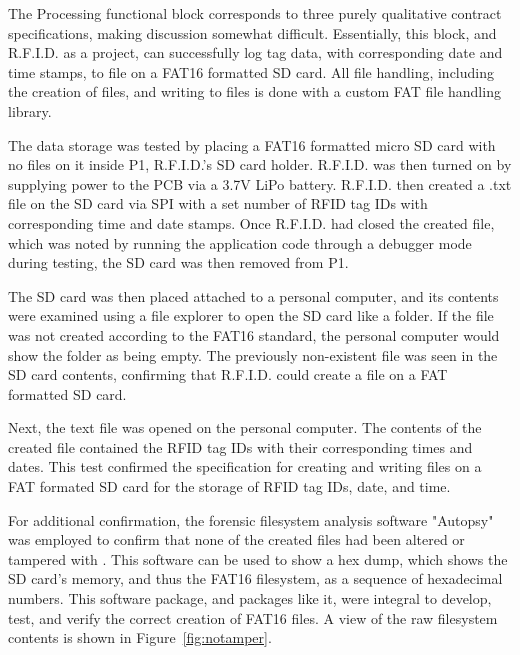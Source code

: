The Processing functional block corresponds to three purely qualitative contract specifications, making discussion somewhat difficult. Essentially, this block, and R.F.I.D. as a project, can successfully log tag data, with corresponding date and time stamps, to file on a FAT16 formatted SD card. All file handling, including the creation of files, and writing to files is done with a custom FAT file handling library.

The data storage was tested by placing a FAT16 formatted micro SD card with no files on it inside P1, R.F.I.D.'s SD card holder. R.F.I.D. was then turned on by supplying power to the PCB via a 3.7V LiPo battery. R.F.I.D. then created a .txt file on the SD card via SPI with a set number of RFID tag IDs with corresponding time and date stamps. Once R.F.I.D. had closed the created file, which was noted by running the application code through a debugger mode during testing, the SD card was then removed from P1.

The SD card was then placed attached to a personal computer, and its contents were examined using a file explorer to open the SD card like a folder. If the file was not created according to the FAT16 standard, the personal computer would show the folder as being empty. The previously non-existent file was seen in the SD card contents, confirming that R.F.I.D. could create a file on a FAT formatted SD card. 

Next, the text file was opened on the personal computer. The contents of the created file contained the RFID tag IDs with their corresponding times and dates. This test confirmed the specification for creating and writing files on a FAT formated SD card for the storage of RFID tag IDs, date, and time. 

For additional confirmation, the forensic filesystem analysis software "Autopsy" was employed to confirm that none of the created files had been altered or tampered with \cite{src_autopsy}. This software can be used to show a hex dump, which shows the SD card's memory, and thus the FAT16 filesystem, as a sequence of hexadecimal numbers. This software package, and packages like it, were integral to develop, test, and verify the correct creation of FAT16 files. A view of the raw filesystem contents is shown in Figure~\ref{fig:notamper}. 


